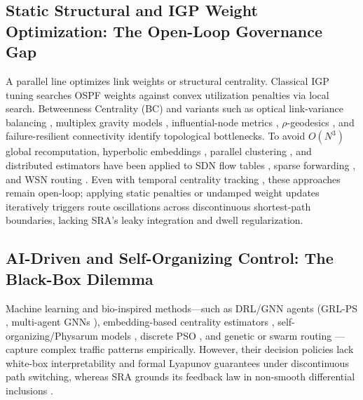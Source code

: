 \documentclass{ccjnl}
\newcommand{\rev}[1]{#1}
\def\rev#1{#1}%
\begin{document}
\subsection{Static Structural \rev{and IGP Weight} Optimization: The Open-Loop Governance Gap}

A parallel line optimizes \rev{link weights \cite{Fortz2000OSPF} or} structural centrality. \rev{Classical IGP tuning \cite{Fortz2000OSPF} searches OSPF weights against convex utilization penalties via local search.} Betweenness Centrality (BC) \cite{Brandes2001Faster} and variants such as optical link-variance balancing \cite{Upadhyay2024OpticalBC}, multiplex gravity models \cite{Ni2023Gravity}, influential-node metrics \cite{Basaras2019Influential, Wehmuth2021SpuriousPaths}, $\rho$-geodesics \cite{DeMedeiros2017QuasiShortest}, and failure-resilient connectivity \cite{Cavallaro2022Connectivity} identify topological bottlenecks. To avoid $O(N^3)$ global recomputation, hyperbolic embeddings \cite{Stai2017Hyperbolic}, parallel clustering \cite{Suppa2015FastBC}, and distributed estimators \cite{Maccari2020DistributedLoad, Maccari2018DistributedDV} have been applied to SDN flow tables \cite{Ma2019FlowTable}, sparse forwarding \cite{Ahmed2025SparseNet}, and WSN routing \cite{Oliveira2010WSNcentrality}. Even with temporal centrality tracking \cite{Ghanem2019DynamicCentrality}, these approaches remain open-loop; \rev{applying static penalties or undamped weight updates iteratively triggers route oscillations across discontinuous shortest-path boundaries, lacking SRA's leaky integration and dwell regularization.}

\subsection{AI-Driven and Self-Organizing Control: The Black-Box Dilemma}

Machine learning and bio-inspired methods—such as DRL/GNN agents (GRL-PS \cite{Wei2023GRLPS}, multi-agent GNNs \cite{Feng2025MultiAgentGNN}), embedding-based centrality estimators \cite{Mendonca2021ApproxCentrality}, self-organizing/Physarum models \cite{Cheng2010SelfOrganizingModel, Guo2010HybridSelfOrg, Li2014PhysarumMulticast}, discrete PSO \cite{Wang2019DPSO}, and genetic or swarm routing \cite{Mu2024CarrierSelfOrg, Lu2022MissileSwarm,ma2021credibility}—capture complex traffic patterns empirically. However, their decision policies lack white-box interpretability and formal Lyapunov guarantees under discontinuous path switching, whereas SRA grounds its feedback law in non-smooth differential inclusions \cite{Aubin1984Differential}.
\end{document}
